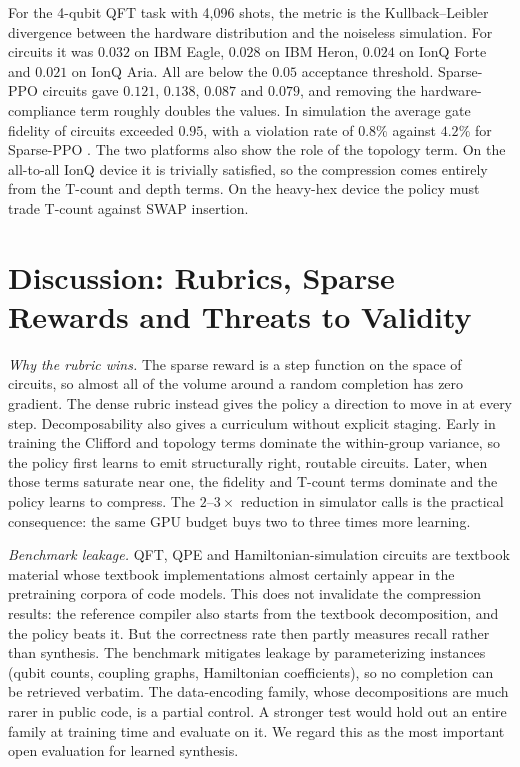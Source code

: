 For the 4-qubit QFT task with 4,096 shots, the metric is the Kullback--Leibler divergence between the hardware distribution and the noiseless simulation. For \rubriq{} circuits it was $0.032$ on IBM Eagle, $0.028$ on IBM Heron, $0.024$ on IonQ Forte and $0.021$ on IonQ Aria. All are below the $0.05$ acceptance threshold. Sparse-PPO circuits gave $0.121$, $0.138$, $0.087$ and $0.079$, and removing the hardware-compliance term roughly doubles the \rubriq{} values. In simulation the average gate fidelity of \rubriq{} circuits exceeded $0.95$, with a violation rate of $0.8\%$ against $4.2\%$ for Sparse-PPO \cite{guo2026rubriq}. The two platforms also show the role of the topology term. On the all-to-all IonQ device it is trivially satisfied, so the compression comes entirely from the T-count and depth terms. On the heavy-hex device the policy must trade T-count against SWAP insertion.

\section{Discussion: Rubrics, Sparse Rewards and Threats to Validity}\label{sec:syn:rubriq-discussion}

\emph{Why the rubric wins.} The sparse reward is a step function on the space of circuits, so almost all of the volume around a random completion has zero gradient. The dense rubric instead gives the policy a direction to move in at every step. Decomposability also gives a curriculum without explicit staging. Early in training the Clifford and topology terms dominate the within-group variance, so the policy first learns to emit structurally right, routable circuits. Later, when those terms saturate near one, the fidelity and T-count terms dominate and the policy learns to compress. The $2$--$3\times$ reduction in simulator calls is the practical consequence: the same GPU budget buys two to three times more learning.

\emph{Benchmark leakage.} QFT, QPE and Hamiltonian-simulation circuits are textbook material whose textbook implementations almost certainly appear in the pretraining corpora of code models. This does not invalidate the compression results: the reference compiler also starts from the textbook decomposition, and the policy beats it. But the correctness rate then partly measures recall rather than synthesis. The benchmark mitigates leakage by parameterizing instances (qubit counts, coupling graphs, Hamiltonian coefficients), so no completion can be retrieved verbatim. The data-encoding family, whose \qcrank{} decompositions are much rarer in public code, is a partial control. A stronger test would hold out an entire family at training time and evaluate on it. We regard this as the most important open evaluation for learned synthesis.

